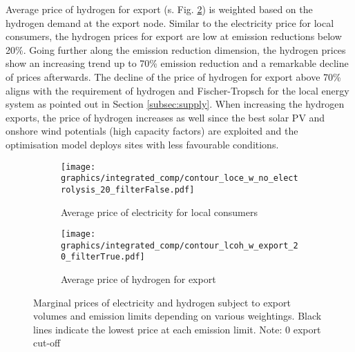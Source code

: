 Average price of hydrogen for export (s. Fig. \ref{fig:export_hy_price}) is weighted based on the hydrogen demand at the export node. Similar to the electricity price for local consumers, the hydrogen prices for export are low at emission reductions below 20\%. Going further along the emission reduction dimension, the hydrogen prices show an increasing trend up to 70\% emission reduction and a remarkable decline of prices afterwards. The decline of the price of hydrogen for export above 70\% aligns with the requirement of hydrogen and Fischer-Tropsch for the local energy system as pointed out in Section \ref{subsec:supply}. %
When increasing the hydrogen exports, the price of hydrogen increases as well since the best solar PV and onshore wind potentials (high capacity factors) are exploited and the optimisation model deploys sites with less favourable conditions. 


\begin{figure*}[t] %
    \centering
    \begin{subfigure}[b]{0.49\linewidth}
        \centering
        \texttt{[image: graphics/integrated\_comp/contour\_loce\_w\_no\_electrolysis\_20\_filterFalse.pdf]}
        \caption{Average price of electricity for local consumers}
        \label{fig:local_el_price}
    \end{subfigure}
    \hfill
    \begin{subfigure}[b]{0.49\linewidth}
        \centering
        \texttt{[image: graphics/integrated\_comp/contour\_lcoh\_w\_export\_20\_filterTrue.pdf]}
        \caption{Average price of hydrogen for export}
        \label{fig:export_hy_price}
    \end{subfigure}
    \hfill
    \caption{Marginal prices of electricity and hydrogen subject to export volumes and emission limits depending on various weightings. Black lines indicate the lowest price at each emission limit. Note: 0 export cut-off}
    \label{fig:marginal_prices}
\end{figure*}

